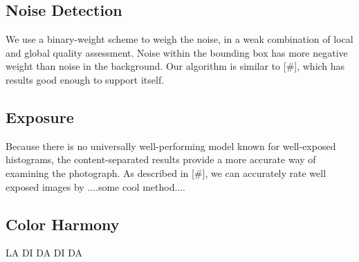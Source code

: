 \documentclass[twocolumn]{article}
\begin{document}
\subsection{Noise Detection}
We use a binary-weight scheme to weigh the noise, in a weak combination of local and global quality assessment. Noise within the bounding box has more negative weight than noise in the background. Our algorithm is similar to [\#], which has results good enough to support itself.
\subsection{Exposure}
Because there is no universally well-performing  model known for well-exposed histograms, the content-separated results provide a more accurate way of examining the photograph. As described in [\#], we can accurately rate well exposed images by ....some cool method....

\subsection{Color Harmony}
LA DI DA DI DA



\end{document}
